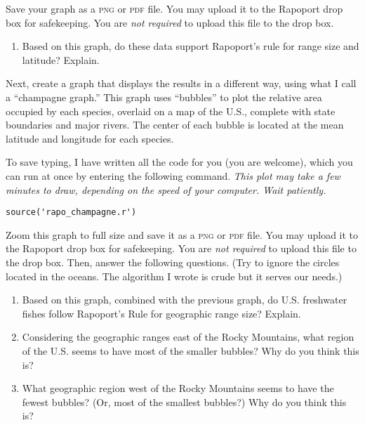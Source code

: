 \documentclass[11pt]{article}
\begin{document}
Save your graph as a \textsc{png} or \textsc{pdf} file. You may upload it to 
the Rapoport drop box for safekeeping. You are 
\emph{not required} to upload this file to the drop box.

\begin{enumerate}[resume]
	\item Based on this graph, do these data support Rapoport's rule 
	for range size and latitude? Explain.

	\vspace{8\baselineskip}

\end{enumerate}

Next, create a graph that displays the results in a different way, 
using what I call a “champagne graph.” This graph uses “bubbles” to 
plot the relative area occupied by each species, overlaid on a map of 
the U.S., complete with state boundaries and major rivers.  The center 
of each bubble is located at the mean latitude and longitude for each 
species.

To save typing, I have written all the code for you (you are welcome), 
which you can run at once by entering the following command. \textit{This plot may take a few minutes to draw, depending on the speed of your computer. Wait patiently.}

\begin{verbatim}
source('rapo_champagne.r')
\end{verbatim}

Zoom this graph to full size and save it as a \textsc{png} or 
\textsc{pdf} file. You may upload it to the Rapoport 
drop box for safekeeping. You are \emph{not required} to upload this 
file to the drop box. Then, answer the following questions. (Try 
to ignore the circles located in the oceans. The algorithm I wrote is 
crude but it serves our needs.)

\begin{enumerate}[resume]
	\item Based on this graph, combined with the previous graph, do
	U.S. freshwater fishes follow Rapoport's Rule for geographic range 
	size? Explain.

	\vspace{9\baselineskip}

	\item Considering the geographic ranges east of the Rocky
	Mountains, what region of the U.S. seems to have most of the
	smaller bubbles? Why do you think this is?

	\vspace{9\baselineskip}

	\item What geographic region west of the Rocky Mountains seems to
	have the fewest bubbles? (Or, most of the smallest bubbles?) Why 
	do you think this is? 
\end{enumerate}
\end{document}
